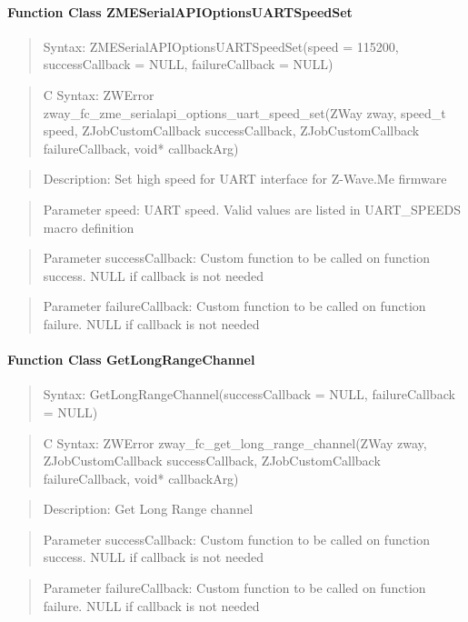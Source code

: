\paragraph{Function Class ZMESerialAPIOptionsUARTSpeedSet}
\begin{quote}Syntax: ZMESerialAPIOptionsUARTSpeedSet(speed = 115200, successCallback = NULL, failureCallback = NULL)\end{quote}
\begin{quote}C Syntax: ZWError zway\_fc\_zme\_serialapi\_options\_uart\_speed\_set(ZWay zway, speed\_t speed, ZJobCustomCallback successCallback, ZJobCustomCallback failureCallback, void* callbackArg)\end{quote}
\begin{quote}Description: Set high speed for UART interface for Z-Wave.Me firmware\end{quote}
\begin{quote}Parameter speed: UART speed. Valid values are listed in UART\_SPEEDS macro definition\end{quote}
\begin{quote}Parameter successCallback: Custom function to be called on function success. NULL if callback is not needed\end{quote}
\begin{quote}Parameter failureCallback: Custom function to be called on function failure. NULL if callback is not needed\end{quote}


\paragraph{Function Class GetLongRangeChannel}
\begin{quote}Syntax: GetLongRangeChannel(successCallback = NULL, failureCallback = NULL)\end{quote}
\begin{quote}C Syntax: ZWError zway\_fc\_get\_long\_range\_channel(ZWay zway, ZJobCustomCallback successCallback, ZJobCustomCallback failureCallback, void* callbackArg)\end{quote}
\begin{quote}Description: Get Long Range channel\end{quote}
\begin{quote}Parameter successCallback: Custom function to be called on function success. NULL if callback is not needed\end{quote}
\begin{quote}Parameter failureCallback: Custom function to be called on function failure. NULL if callback is not needed\end{quote}


